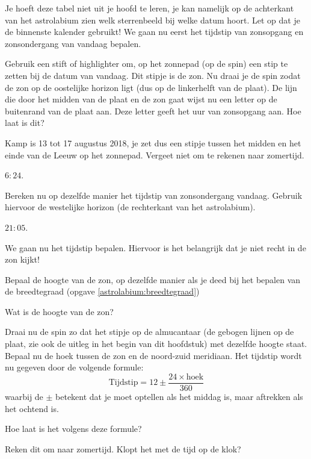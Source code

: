 Je hoeft deze tabel niet uit je hoofd te leren, je kan namelijk op de achterkant van het astrolabium zien welk sterrenbeeld bij welke datum hoort. Let op dat je de binnenste kalender gebruikt! We gaan nu eerst het tijdstip van zonsopgang en zonsondergang van vandaag bepalen. 
\begin{opgave}
 Gebruik een stift of highlighter om, op het zonnepad (op de spin) een stip te zetten bij de datum van vandaag. Dit stipje is de zon. Nu draai je de spin zodat de zon op de oostelijke horizon ligt (dus op de linkerhelft van de plaat). De lijn die door het midden van de plaat en de zon gaat wijst nu een letter op de buitenrand van de plaat aan. Deze letter geeft het uur van zonsopgang aan. Hoe laat is dit?
 \begin{hint}
  Kamp is 13 tot 17 augustus 2018, je zet dus een stipje tussen het midden en het einde van de Leeuw op het zonnepad. Vergeet niet om te rekenen naar zomertijd.
 \end{hint}
 \begin{antwoord}
  $6:24$.
 \end{antwoord}
\end{opgave}

\begin{opgave}
 Bereken nu op dezelfde manier het tijdstip van zonsondergang vandaag. Gebruik hiervoor de westelijke horizon (de rechterkant van het astrolabium). 
 \begin{antwoord}
  $21:05$.
 \end{antwoord}
\end{opgave}

We gaan nu het tijdstip bepalen. Hiervoor is het belangrijk dat je niet recht in de zon kijkt!
\begin{opgave}
 Bepaal de hoogte van de zon, op dezelfde manier als je deed bij het bepalen van de breedtegraad (opgave \ref{astrolabium:breedtegraad})
 \begin{subopgave}
 Wat is de hoogte van de zon?
 \end{subopgave}
 Draai nu de spin zo dat het stipje op de almucantaar (de gebogen lijnen op de plaat, zie ook de uitleg in het begin van dit hoofdstuk) met dezelfde hoogte staat. Bepaal nu de hoek tussen de zon en de noord-zuid meridiaan. Het tijdstip wordt nu gegeven door de volgende formule:
 \[ \textrm{Tijdstip} = 12 \pm \frac{24\times\textrm{hoek}}{360} \]
 waarbij de $\pm$ betekent dat je moet optellen als het middag is, maar aftrekken als het ochtend is.
 \begin{subopgave}
  Hoe laat is het volgens deze formule?
 \end{subopgave}
 \begin{subopgave}
  Reken dit om naar zomertijd. Klopt het met de tijd op de klok?
 \end{subopgave}
\end{opgave}

